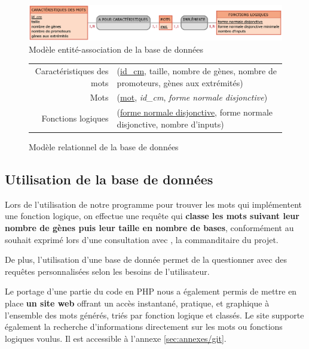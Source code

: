 \begin{figure}[!h]
\centering
\includegraphics[scale=0.65]{images/MEA_BDD}
\caption{\label{fig:technique/bdd/architecture/1} Modèle entité-association de la base de données}
\end{figure}
\begin{figure}[!h]
\centering
\begin{tabular}{rl}
Caractéristiques des mots & (\underline{id\_cm}, taille, nombre de gènes, nombre de promoteurs, gènes aux extrémités)\\ 
Mots & (\underline{mot}, \textsl{id\_cm}, \textsl{forme normale disjonctive})\\
Fonctions logiques & (\underline{forme normale disjonctive}, forme normale disjonctive, nombre d'inputs)\\
\end{tabular}
\caption{\label{fig:technique/bdd/architecture/2} Modèle relationnel de la base de données}
\end{figure}

\subsection{Utilisation de la base de données}
\label{subsec:technique/bdd/utilisation}
\par
Lors de l'utilisation de notre programme pour trouver les mots qui implémentent une fonction logique, on effectue une requête qui \textbf{classe les mots suivant leur nombre de gènes puis leur taille en nombre de bases}, conformément au souhait exprimé lors d'une consultation avec , la commanditaire du projet.\\


\par
De plus, l'utilisation d'une base de donnée permet de la questionner avec des requêtes personnalisées selon les besoins de l'utilisateur.
\par
Le portage d'une partie du code en PHP nous a également permis de mettre en place \textbf{un site web} offrant un accès instantané, pratique, et graphique à l'ensemble des mots générés, triés par fonction logique et classés. Le site supporte également la recherche d'informations directement sur les mots ou fonctions logiques voulus. Il est accessible à l'annexe \ref{sec:annexes/git}.

